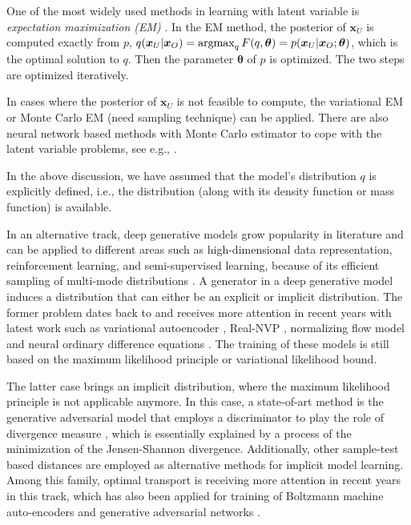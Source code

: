 One of the most widely used methods in learning with latent variable is \textit{expectation maximization (EM)} \cite{DEMP1977em}. In the EM method, the posterior of $\bm{x}_U$ is computed exactly from $p$, $q(\bm{x}_U|\bm{x}_O) = \operatorname{argmax}_{q}{F(q, \bm{\theta})} = p(\bm{x}_U|\bm{x}_O; \bm{\theta})$, which is the optimal solution to $q$. Then the parameter $\bm{\theta}$ of $p$ is optimized. The two steps are optimized iteratively.

In cases where the posterior of $\bm{x}_U$ is not feasible to compute, the variational EM\cite[section~6.2.2]{wainwright2008graphical} or Monte Carlo EM (need sampling technique) \cite{neath2012convergence} can be applied. There are also neural network based methods with Monte Carlo estimator to cope with the latent variable problems, see e.g., \cite{DBLP:journals/corr/KingmaW13, kuleshov2017NVIL, lazarogredilla2019learning, goodfellow2014gan}.


In the above discussion, we have assumed that the model's distribution $q$ is explicitly defined, i.e., the distribution (along with its density function or mass function) is available. 

In an alternative track, deep generative models grow popularity in literature and can be applied to different areas such as high-dimensional data representation, reinforcement learning, and semi-supervised learning, because of its efficient sampling of multi-mode distributions \cite{2017arXiv170100160G}. A generator in a deep generative model induces a distribution that can either be an explicit or implicit distribution. The former problem dates back to \cite{deco1995high-order} and receives more attention in recent years with latest work such as variational autoencoder \cite{DBLP:journals/corr/KingmaW13}, Real-NVP \cite{2016arXiv160508803D}, normalizing flow model \cite{2018arXiv180703039K} and neural ordinary difference equations \cite{ricky2018ODE}. The training of these models is still based on the maximum likelihood principle or variational likelihood bound.

The latter case brings an implicit distribution, where the maximum likelihood principle is not applicable anymore. In this case, a state-of-art method is the generative adversarial model that employs a discriminator to play the role of divergence measure \cite{goodfellow2014gan, 2017arXiv170104862A, NIPS2016_6125}, which is essentially explained by a process of the minimization of the Jensen-Shannon divergence. Additionally, other sample-test based distances are employed as alternative methods for implicit model learning. Among this family, optimal transport is receiving more attention in recent years \cite{santambrogio2015optimal, 2013arXiv1306.0895C} in this track, which has also been applied for training of Boltzmann machine \cite{NIPS2016_6248} auto-encoders\cite{2017arXiv171101558T} and generative adversarial networks \cite{2017arXiv170107875A}.



